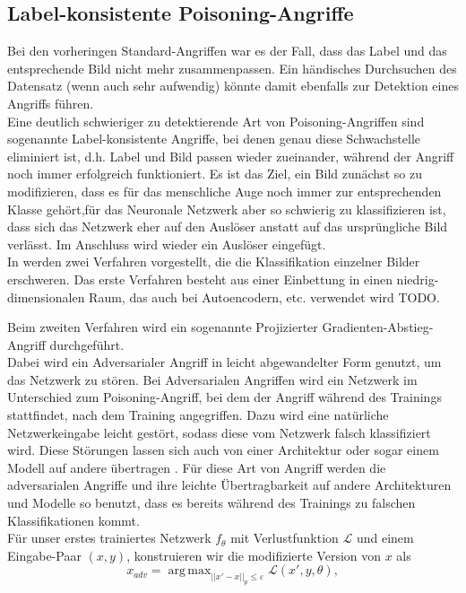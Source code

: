 \documentclass[11pt,a4paper]{article}
\DeclareMathOperator*{\argmax}{arg\,max}
\numberwithin{equation}{section}
\begin{document}
	\subsection{Label-konsistente Poisoning-Angriffe}
	Bei den vorheringen Standard-Angriffen war es der Fall, dass das Label und das entsprechende Bild nicht mehr zusammenpassen. Ein händisches Durchsuchen des Datensatz (wenn auch sehr aufwendig) könnte damit ebenfalls zur Detektion eines Angriffs führen.\\
	Eine deutlich schwieriger zu detektierende Art von Poisoning-Angriffen sind sogenannte Label-konsistente Angriffe, bei denen genau diese Schwachstelle eliminiert ist, d.h. Label und Bild passen wieder zueinander, während der Angriff noch immer erfolgreich funktioniert. Es ist das Ziel, ein Bild zunächst so zu modifizieren, dass es für das menschliche Auge noch immer zur entsprechenden Klasse gehört,für das Neuronale Netzwerk aber so schwierig zu klassifizieren ist, dass sich das Netzwerk eher auf den Auslöser anstatt auf das ursprüngliche Bild verlässt. Im Anschluss wird wieder ein Auslöser eingefügt.\\
		
	In \cite{labelconsistent} werden zwei Verfahren vorgestellt, die die Klassifikation einzelner Bilder erschweren. Das erste Verfahren besteht aus einer Einbettung in einen niedrig-dimensionalen Raum, das auch bei Autoencodern, etc. verwendet wird TODO.
	
	Beim zweiten Verfahren wird ein sogenannte Projizierter Gradienten-Abstieg-Angriff durchgeführt.\\
	Dabei wird ein Adversarialer Angriff in leicht abgewandelter Form genutzt, um das Netzwerk zu stören. Bei Adversarialen Angriffen wird ein Netzwerk im Unterschied zum Poisoning-Angriff, bei dem der Angriff während des Trainings stattfindet, nach dem Training angegriffen. Dazu wird eine natürliche Netzwerkeingabe leicht gestört, sodass diese vom Netzwerk falsch klassifiziert wird. Diese Störungen lassen sich auch von einer Architektur oder sogar einem Modell auf andere übertragen \cite{szegedy2013intriguing, papernot2016transferability}.
	Für diese Art von Angriff werden die adversarialen Angriffe und ihre leichte Übertragbarkeit auf andere Architekturen und Modelle so benutzt, dass es bereits während des Trainings zu falschen Klassifikationen kommt.\\
	Für unser erstes trainiertes Netzwerk $f_\theta$ mit Verlustfunktion $\mathcal{L}$ und einem Eingabe-Paar $(x,y)$, konstruieren wir die modifizierte Version von $x$ als
	\begin{equation}
		x_{adv} = \argmax_{||x'-x||_p \leq \varepsilon}{\mathcal{L}(x',y,\theta)},
	\end{equation}
	
\end{document}
